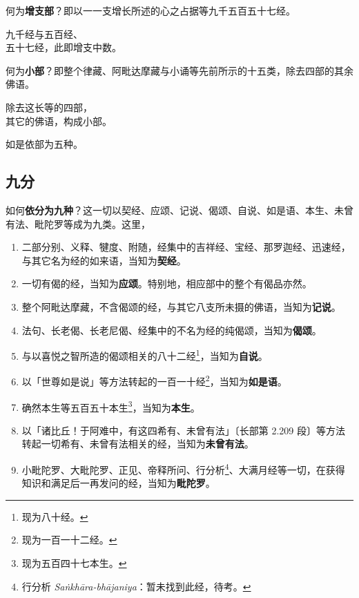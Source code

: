 何为\textbf{增支部}？即以一一支增长所述的心之占据等九千五百五十七经。

\begin{quoting}九千经与五百经、\\五十七经，此即增支中数。\end{quoting}

何为\textbf{小部}？即整个律藏、阿毗达摩藏与小诵等先前所示的十五类，除去四部的其余佛语。

\begin{quoting}除去这长等的四部，\\其它的佛语，构成小部。\end{quoting}

如是依部为五种。

\subsection*{九分}

如何\textbf{依分为九种}？这一切以契经、应颂、记说、偈颂、自说、如是语、本生、未曾有法、毗陀罗等成为九类。这里，

\begin{enumerate}[nosep]
    \item 二部分别、义释、犍度、附随，经集中的吉祥经、宝经、那罗迦经、迅速经，与其它名为经的如来语，当知为\textbf{契经}。
    \item 一切有偈的经，当知为\textbf{应颂}。特别地，相应部中的整个有偈品亦然。
    \item 整个阿毗达摩藏，不含偈颂的经，与其它八支所未摄的佛语，当知为\textbf{记说}。
    \item 法句、长老偈、长老尼偈、经集中的不名为经的纯偈颂，当知为\textbf{偈颂}。
    \item 与以喜悦之智所造的偈颂相关的八十二经\footnote{现为八十经。}，当知为\textbf{自说}。
    \item 以「世尊如是说」等方法转起的一百一十经\footnote{现为一百一十二经。}，当知为\textbf{如是语}。
    \item 确然本生等五百五十本生\footnote{现为五百四十七本生。}，当知为\textbf{本生}。
    \item 以「诸比丘！于阿难中，有这四希有、未曾有法」{\bluefootnotesize 〔长部第 2.209 段〕}等方法转起一切希有、未曾有法相关的经，当知为\textbf{未曾有法}。
    \item 小毗陀罗、大毗陀罗、正见、帝释所问、行分析\footnote{行分析 \textit{Saṅkhāra-bhājaniya}：暂未找到此经，待考。}、大满月经等一切，在获得知识和满足后一再发问的经，当知为\textbf{毗陀罗}。
\end{enumerate}

